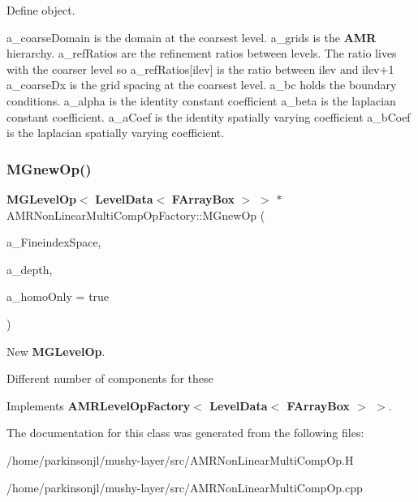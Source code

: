 Define object. 

a\+\_\+coarse\+Domain is the domain at the coarsest level. a\+\_\+grids is the \textbf{ A\+MR} hierarchy. a\+\_\+ref\+Ratios are the refinement ratios between levels. The ratio lives with the coarser level so a\+\_\+ref\+Ratios\mbox{[}ilev\mbox{]} is the ratio between ilev and ilev+1 a\+\_\+coarse\+Dx is the grid spacing at the coarsest level. a\+\_\+bc holds the boundary conditions. a\+\_\+alpha is the identity constant coefficient a\+\_\+beta is the laplacian constant coefficient. a\+\_\+a\+Coef is the identity spatially varying coefficient a\+\_\+b\+Coef is the laplacian spatially varying coefficient. \mbox{\label{class_a_m_r_non_linear_multi_comp_op_factory_a4a0bf3a8d0337e5a42ce03648779bc73}} 
\subsubsection{\texorpdfstring{M\+Gnew\+Op()}{MGnewOp()}}
{\footnotesize\ttfamily \textbf{ M\+G\+Level\+Op}$<$ \textbf{ Level\+Data}$<$ \textbf{ F\+Array\+Box} $>$ $>$ $\ast$ A\+M\+R\+Non\+Linear\+Multi\+Comp\+Op\+Factory\+::\+M\+Gnew\+Op (\begin{DoxyParamCaption}\item[{const \textbf{ Problem\+Domain} \&}]{a\+\_\+\+Fineindex\+Space,  }\item[{int}]{a\+\_\+depth,  }\item[{bool}]{a\+\_\+homo\+Only = {\ttfamily true} }\end{DoxyParamCaption})\hspace{0.3cm}{\ttfamily [virtual]}}



New \textbf{ M\+G\+Level\+Op}. 

Different number of components for these 

Implements \textbf{ A\+M\+R\+Level\+Op\+Factory$<$ Level\+Data$<$ F\+Array\+Box $>$ $>$}.



The documentation for this class was generated from the following files\+:\begin{DoxyCompactItemize}
\item 
/home/parkinsonjl/mushy-\/layer/src/A\+M\+R\+Non\+Linear\+Multi\+Comp\+Op.\+H\item 
/home/parkinsonjl/mushy-\/layer/src/A\+M\+R\+Non\+Linear\+Multi\+Comp\+Op.\+cpp\end{DoxyCompactItemize}
